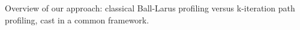 \label{fig:kblpp-approach} Overview of our approach: classical Ball-Larus profiling versus k-iteration path profiling, cast in a common framework.
